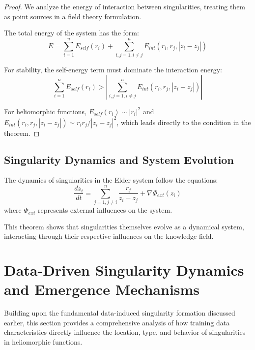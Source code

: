 \begin{definition}
\begin{enumerate}
\begin{proof}
We analyze the energy of interaction between singularities, treating them as point sources in a field theory formulation.

The total energy of the system has the form:
\begin{equation}
E = \sum_{i=1}^n E_{self}(r_i) + \sum_{i,j=1, i \neq j}^n E_{int}(r_i, r_j, |z_i - z_j|)
\end{equation}

For stability, the self-energy term must dominate the interaction energy:
\begin{equation}
\sum_{i=1}^n E_{self}(r_i) > \left|\sum_{i,j=1, i \neq j}^n E_{int}(r_i, r_j, |z_i - z_j|)\right|
\end{equation}

For heliomorphic functions, $E_{self}(r_i) \sim |r_i|^2$ and $E_{int}(r_i, r_j, |z_i - z_j|) \sim r_i r_j / |z_i - z_j|^2$, which leads directly to the condition in the theorem.
\end{proof}

\subsection{Singularity Dynamics and System Evolution}

\begin{theorem}
The dynamics of singularities in the Elder system follow the equations:
\begin{equation}
\frac{dz_i}{dt} = \sum_{j=1, j \neq i}^n \frac{r_j}{z_i - z_j} + \nabla \Phi_{ext}(z_i)
\end{equation}
where $\Phi_{ext}$ represents external influences on the system.
\end{theorem}

This theorem shows that singularities themselves evolve as a dynamical system, interacting through their respective influences on the knowledge field.

\section{Data-Driven Singularity Dynamics and Emergence Mechanisms}

Building upon the fundamental data-induced singularity formation discussed earlier, this section provides a comprehensive analysis of how training data characteristics directly influence the location, type, and behavior of singularities in heliomorphic functions.


\end{enumerate}
\end{definition}
